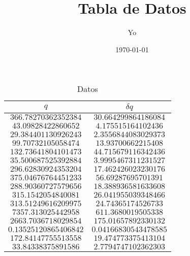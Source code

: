 \documentclass[11pt, spanish, letterpage]{article}
\title{Tabla de Datos}
\author{Yo}
\date{\today}
\begin{document}
 
\maketitle 
\begin{table}[H] 
\centering 
\begin{tabular}{||c|c||} 
\hline 
\hline 
$q$ & $\delta q$ \\ 
\hline 
\hline 
$ 366.78270362352384 $ & $ 30.664299864186084 $ \\ 
$ 43.09828422860652 $ & $ 4.175515164102436 $ \\ 
$ 29.384401130926243 $ & $ 2.3556844083029373 $ \\ 
$ 99.70732105058474 $ & $ 13.93700662215408 $ \\ 
$ 132.73641804101473 $ & $ 44.715679116342436 $ \\ 
$ 35.500687525392884 $ & $ 3.9995467311231527 $ \\ 
$ 296.62830924353204 $ & $ 17.462426023230176 $ \\ 
$ 375.04676764451233 $ & $ 56.69287695701391 $ \\ 
$ 288.90360727579656 $ & $ 18.388936581633608 $ \\ 
$ 315.1542054840081 $ & $ 26.041955039348466 $ \\ 
$ 313.51249616209975 $ & $ 24.74365174526733 $ \\ 
$ 7357.313025442958 $ & $ 611.3680019505338 $ \\ 
$ 2663.7036718029854 $ & $ 175.01657892330132 $ \\ 
$ 0.13525120865406842 $ & $ 0.04166830543478585 $ \\ 
$ 172.84147755513558 $ & $ 19.474773375413104 $ \\ 
$ 33.84338375891586 $ & $ 2.7794747102362303 $ \\ 
\hline 
\hline 
\end{tabular} 
\caption{Datos} 
\end{table} 
\end{document}
